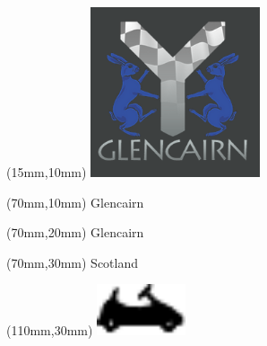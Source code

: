 \null\newpage
\begin{textblock*}{50mm}(15mm,10mm)%
\includegraphics[width=50mm]{LG/GLCN.png}
\end{textblock*}
\begin{textblock*}{130mm}(70mm,10mm)%
{\fontsize{20}{20}\selectfont Glencairn}\\
\end{textblock*}
\begin{textblock*}{120mm}(70mm,20mm)%
{\fontsize{16}{16}\selectfont Glencairn}\\
\end{textblock*}
\begin{textblock*}{120mm}(70mm,30mm)%
{\fontsize{12}{12}\selectfont Scotland}
\end{textblock*}
\begin{textblock*}{30mm}(110mm,30mm)%
\centering
\includegraphics[height=15mm]{icons/kart.pdf}
\end{textblock*}
